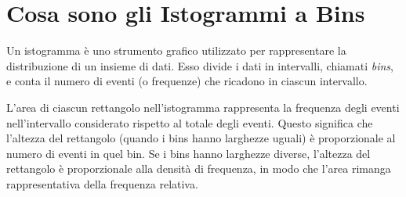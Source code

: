 \section{Cosa sono gli Istogrammi a Bins}
Un istogramma è uno strumento grafico utilizzato per rappresentare la distribuzione di un insieme di dati. Esso divide i dati in intervalli, chiamati \textit{bins}, e conta il numero di eventi (o frequenze) che ricadono in ciascun intervallo.

L'area di ciascun rettangolo nell'istogramma rappresenta la frequenza degli eventi nell'intervallo considerato rispetto al totale degli eventi. Questo significa che l'altezza del rettangolo (quando i bins hanno larghezze uguali) è proporzionale al numero di eventi in quel bin. Se i bins hanno larghezze diverse, l'altezza del rettangolo è proporzionale alla densità di frequenza, in modo che l'area rimanga rappresentativa della frequenza relativa.

